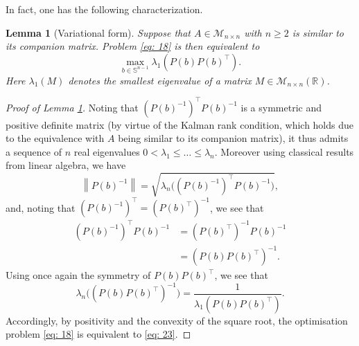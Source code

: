 \documentclass[journal,twoside,web]{ieeecolor}
\newcommand{\R}{\mathbb{R}}
\newtheorem{lemma}{Lemma}
\begin{document}
	In fact, one has the following characterization.
	\medskip
	
	\begin{lemma}[Variational form]
	\label{lem: spectral.reform}
	Suppose that $A\in\mathcal{M}_{n\times n}$ with $n\geqslant 2$ is similar to its companion matrix.
	Problem \eqref{eq: 18} is then equivalent to
	\begin{equation} \label{eq: 23}
	\boxed{
	\max_{b\in\mathbb{S}^{n-1}} \lambda_{1}\left(P(b)P(b)^\top\right).
	}
	\end{equation}
	Here $\lambda_{1}(M)$ denotes the smallest eigenvalue of a matrix $M\in\mathcal{M}_{n\times n}(\R)$.
	\end{lemma}
	\medskip
	
	\begin{proof}[Proof of Lemma \ref{lem: spectral.reform}]
	Noting that $(P(b)^{-1})^\top P(b)^{-1}$ is a symmetric and positive definite matrix (by virtue of the Kalman rank condition, which holds due to the equivalence with $A$ being similar to its companion matrix), it thus admits a sequence of  $n$ real eigenvalues $0 < \lambda_1 \leqslant \ldots \leqslant \lambda_n$. Moreover using classical results from linear algebra, we have
	\begin{equation} \label{eq: 2.26}
	\left\|P(b)^{-1}\right\| = \sqrt{\lambda_{n}\Big((P(b)^{-1})^\top P(b)^{-1}\Big)},
	\end{equation}
	and, noting that $\left(P(b)^{-1}\right)^\top = \left(P(b)^\top\right)^{-1}$, we see that
	\begin{align*}
	\left(P(b)^{-1}\right)^\top P(b)^{-1} &= \left(P(b)^\top\right)^{-1} P(b)^{-1} \\
	&= \left(P(b)P(b)^\top\right)^{-1}.
	\end{align*}
	Using once again the symmetry of $P(b)P(b)^\top$, we see that
	\begin{equation} \label{eq: 2.28}
	\lambda_{n}\Big((P(b)P(b)^\top)^{-1}\Big) = \frac{1}{\lambda_{1}(P(b)P(b)^\top)}.
	\end{equation}
	Accordingly, by positivity and the convexity of the square root, the optimisation problem \eqref{eq: 18} is equivalent to \eqref{eq: 23}.
	\end{proof}
	\medskip
	
\end{document}
